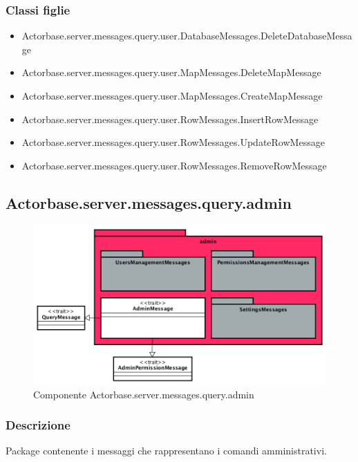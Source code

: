 \documentclass[a4paper]{article}
\begin{document}
			\subsubsection{Classi figlie}
				\begin{itemize}
					\item Actorbase.server.messages.query.user.DatabaseMessages.DeleteDatabaseMessage
					\item Actorbase.server.messages.query.user.MapMessages.DeleteMapMessage
					\item Actorbase.server.messages.query.user.MapMessages.CreateMapMessage
					\item Actorbase.server.messages.query.user.RowMessages.InsertRowMessage
					\item Actorbase.server.messages.query.user.RowMessages.UpdateRowMessage
					\item Actorbase.server.messages.query.user.RowMessages.RemoveRowMessage
				\end{itemize}
				
		\subsection{Actorbase.server.messages.query.admin}
		
			\begin{figure}[H]
				\centering
				\includegraphics[width=\textwidth]{ST/Server/adminLevel}
				\caption{Componente Actorbase.server.messages.query.admin}
			\end{figure}
			
			\subsubsection{Descrizione}
				Package contenente i messaggi che rappresentano i comandi amministrativi.
				
\end{document}
